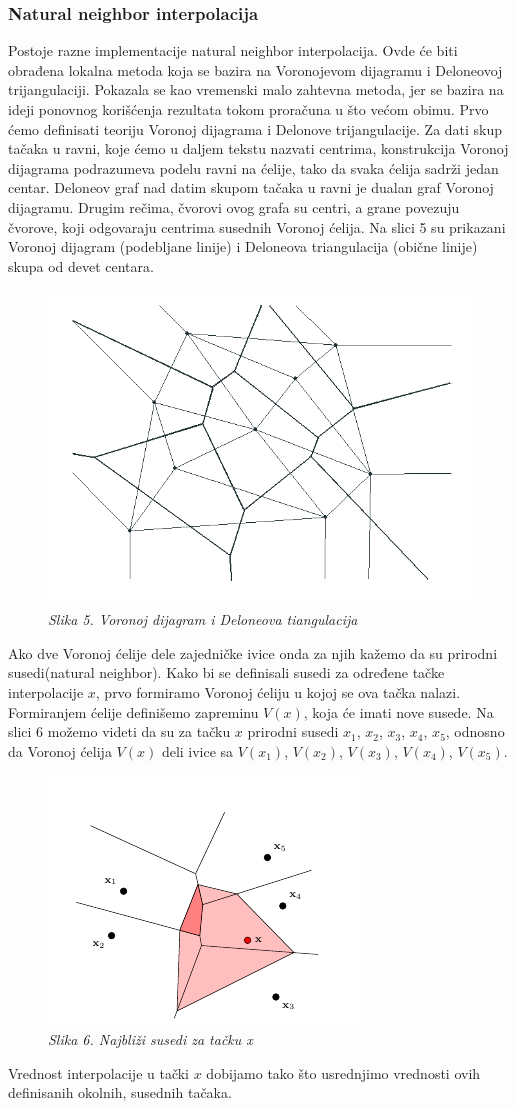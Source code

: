 \documentclass[12pt]{article}
\begin{document}
\subsubsection{Natural neighbor interpolacija}
Postoje razne implementacije natural neighbor interpolacija. Ovde će biti obrađena lokalna metoda koja se bazira na Voronojevom dijagramu i Deloneovoj trijangulaciji. Pokazala se kao vremenski malo zahtevna metoda, jer se bazira na ideji ponovnog korišćenja rezultata tokom proračuna u što većom obimu. Prvo ćemo definisati teoriju Voronoj dijagrama i Delonove trijangulacije.
Za dati skup tačaka u ravni, koje ćemo u daljem tekstu nazvati centrima, konstrukcija Voronoj dijagrama podrazumeva podelu ravni na ćelije, tako da svaka ćelija sadrži jedan centar. Deloneov graf nad datim skupom tačaka u ravni je dualan graf Voronoj dijagramu. Drugim rečima, čvorovi ovog grafa su centri, a grane povezuju čvorove, koji odgovaraju centrima susednih Voronoj ćelija. Na slici 5 su prikazani
Voronoj dijagram (podebljane linije) i Deloneova triangulacija (obične linije) skupa od devet centara.
\begin{figure}[h!]
	\centering
	\includegraphics[width=0.5\linewidth]{vor.png}
	\caption*{\textsl{Slika 5. Voronoj dijagram i Deloneova tiangulacija}}
\end{figure} 
Ako dve Voronoj ćelije dele zajedničke ivice onda za njih kažemo da su prirodni susedi(natural neighbor). Kako bi se definisali susedi za određene tačke interpolacije $x$, prvo formiramo Voronoj ćeliju u kojoj se ova tačka nalazi. Formiranjem ćelije definišemo zapreminu $V(x)$, koja će imati nove susede. Na slici 6 možemo videti da su za tačku $x$ prirodni susedi $x_{1}$, $x_{2}$, $x_{3}$, $x_{4}$, $x_{5}$, odnosno da Voronoj ćelija $V(x)$ deli ivice sa $V(x_1)$, $V(x_2)$, $V(x_3)$, $V(x_4)$, $V(x_5)$.    
\begin{figure}[h!]
\centering
\includegraphics[width=0.6\linewidth]{slika6.png}
\caption*{\textsl{Slika 6. Najbliži susedi za tačku x}}
\end{figure}
Vrednost interpolacije u tački $x$ dobijamo tako što usrednjimo vrednosti ovih definisanih okolnih, susednih tačaka. 
\end{document}
